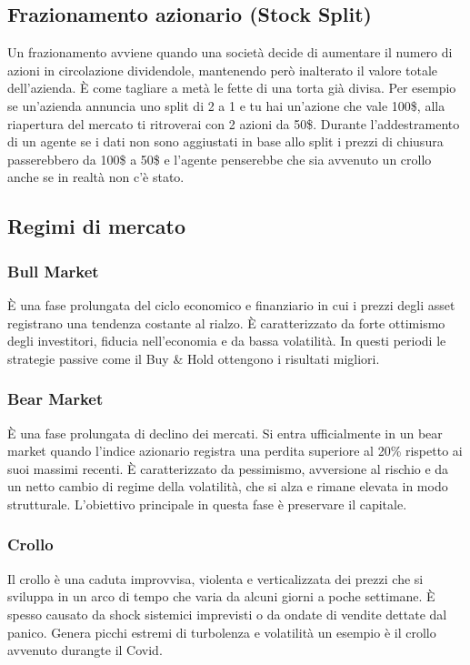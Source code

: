 \subsection{Frazionamento azionario (Stock Split)}
Un frazionamento avviene quando una società decide di aumentare il numero di azioni in circolazione dividendole, mantenendo però inalterato il valore totale dell'azienda.
È come tagliare a metà le fette di una torta già divisa. Per esempio se un'azienda annuncia uno split di 2 a 1 e tu hai un'azione che vale 100\$, alla riapertura del mercato ti ritroverai con 2 azioni da 50\$.
Durante l'addestramento di un agente se i dati non sono aggiustati in base allo split i prezzi di chiusura passerebbero da 100\$ a 50\$ e l'agente penserebbe che sia avvenuto un crollo anche se in realtà non c'è stato.

\subsection{Regimi di mercato}
\subsubsection{Bull Market}

È una fase prolungata del ciclo economico e finanziario in cui i prezzi degli asset registrano una tendenza costante al rialzo. 
È caratterizzato da forte ottimismo degli investitori, fiducia nell'economia e da bassa volatilità. 
In questi periodi le strategie passive come il Buy \& Hold ottengono i risultati migliori.

\subsubsection{Bear Market}
È una fase prolungata di declino dei mercati. 
Si entra ufficialmente in un bear market quando l'indice azionario registra una perdita superiore al 20\% rispetto ai suoi massimi recenti. 
È caratterizzato da pessimismo, avversione al rischio e da un netto cambio di regime della volatilità, che si alza e rimane elevata in modo strutturale. 
L'obiettivo principale in questa fase è preservare il capitale.

\subsubsection{Crollo}
Il crollo è una caduta improvvisa, violenta e verticalizzata dei prezzi che si sviluppa in un arco di tempo che varia da alcuni giorni a poche settimane. 
È spesso causato da shock sistemici imprevisti o da ondate di vendite dettate dal panico. 
Genera picchi estremi di turbolenza e volatilità un esempio è il crollo avvenuto durangte il Covid.

